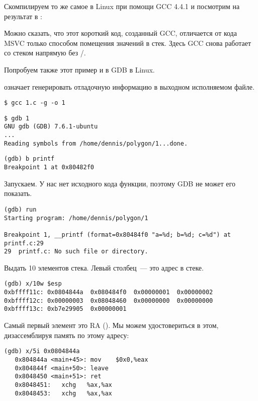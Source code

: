 
Скомпилируем то же самое в Linux при помощи GCC 4.4.1 и посмотрим на результат в \IDA:



Можно сказать, что этот короткий код, созданный GCC, отличается от кода MSVC только способом помещения 
значений в стек.
Здесь GCC снова работает со стеком напрямую без \PUSH/\POP.


Попробуем также этот пример и в \ac{GDB} в Linux.

 означает генерировать отладочную информацию в выходном исполняемом файле.

\begin{lstlisting}
$ gcc 1.c -g -o 1
\end{lstlisting}

\begin{lstlisting}
$ gdb 1
GNU gdb (GDB) 7.6.1-ubuntu
...
Reading symbols from /home/dennis/polygon/1...done.
\end{lstlisting}

\begin{lstlisting}[caption=установим точку останова на \printf]
(gdb) b printf
Breakpoint 1 at 0x80482f0
\end{lstlisting}

Запускаем.
У нас нет исходного кода функции, поэтому \ac{GDB} не может его показать.

\begin{lstlisting}
(gdb) run
Starting program: /home/dennis/polygon/1 

Breakpoint 1, __printf (format=0x80484f0 "a=%d; b=%d; c=%d") at printf.c:29
29	printf.c: No such file or directory.
\end{lstlisting}

Выдать 10 элементов стека. Левый столбец~--- это адрес в стеке.

\begin{lstlisting}
(gdb) x/10w $esp
0xbffff11c:	0x0804844a	0x080484f0	0x00000001	0x00000002
0xbffff12c:	0x00000003	0x08048460	0x00000000	0x00000000
0xbffff13c:	0xb7e29905	0x00000001
\end{lstlisting}

Самый первый элемент это \ac{RA} ().
Мы можем удостовериться в этом, дизассемблируя память по этому адресу:

\begin{lstlisting}[label=NOP_as_XCHG_example,style=customasmx86]
(gdb) x/5i 0x0804844a
   0x804844a <main+45>:	mov    $0x0,%eax
   0x804844f <main+50>:	leave  
   0x8048450 <main+51>:	ret    
   0x8048451:	xchg   %ax,%ax
   0x8048453:	xchg   %ax,%ax
\end{lstlisting}

